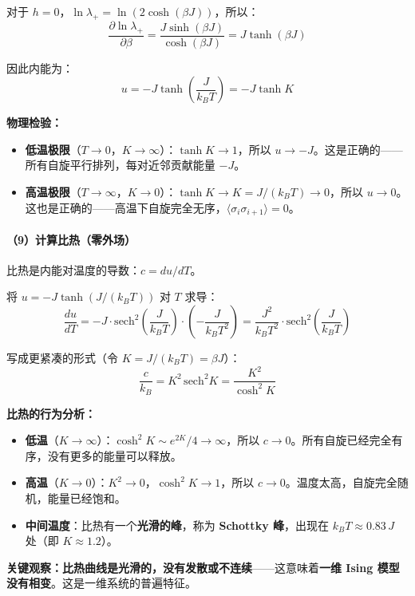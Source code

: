 \documentclass[12pt,a4paper]{ctexart}
\begin{document}
对于 $h=0$，$\ln \lambda_+ = \ln(2\cosh(\beta J))$，所以：
\[
\frac{\partial \ln\lambda_+}{\partial \beta} = \frac{J \sinh(\beta J)}{\cosh(\beta J)} = J \tanh(\beta J)
\]

因此内能为：
\begin{equation}
\boxed{
u = -J \tanh\!\left(\frac{J}{k_B T}\right) = -J \tanh K
}
\end{equation}

\textbf{物理检验：}
\begin{itemize}
    \item \textbf{低温极限}（$T \to 0$，$K \to \infty$）：$\tanh K \to 1$，所以 $u \to -J$。这是正确的——所有自旋平行排列，每对近邻贡献能量 $-J$。
    \item \textbf{高温极限}（$T \to \infty$，$K \to 0$）：$\tanh K \to K = J/(k_BT) \to 0$，所以 $u \to 0$。这也是正确的——高温下自旋完全无序，$\langle \sigma_i \sigma_{i+1}\rangle = 0$。
\end{itemize}

\paragraph{（9）计算比热（零外场）}

比热是内能对温度的导数：$c = du/dT$。

将 $u = -J\tanh(J/(k_BT))$ 对 $T$ 求导：
\[
\frac{du}{dT} = -J \cdot \mathrm{sech}^2\!\left(\frac{J}{k_BT}\right) \cdot \left(-\frac{J}{k_BT^2}\right) = \frac{J^2}{k_BT^2} \cdot \mathrm{sech}^2\!\left(\frac{J}{k_BT}\right)
\]

写成更紧凑的形式（令 $K = J/(k_BT) = \beta J$）：
\begin{equation}
\boxed{
\frac{c}{k_B} = K^2 \,\mathrm{sech}^2 K = \frac{K^2}{\cosh^2 K}
}
\end{equation}

\textbf{比热的行为分析：}
\begin{itemize}
    \item \textbf{低温}（$K \to \infty$）：$\cosh^2 K \sim e^{2K}/4 \to \infty$，所以 $c \to 0$。所有自旋已经完全有序，没有更多的能量可以释放。
    \item \textbf{高温}（$K \to 0$）：$K^2 \to 0$，$\cosh^2 K \to 1$，所以 $c \to 0$。温度太高，自旋完全随机，能量已经饱和。
    \item \textbf{中间温度}：比热有一个\textbf{光滑的峰}，称为 \textbf{Schottky 峰}，出现在 $k_BT \approx 0.83\, J$ 处（即 $K \approx 1.2$）。
\end{itemize}

\textbf{关键观察：比热曲线是光滑的，没有发散或不连续}——这意味着\textbf{一维 Ising 模型没有相变}。这是一维系统的普遍特征。
\end{document}
